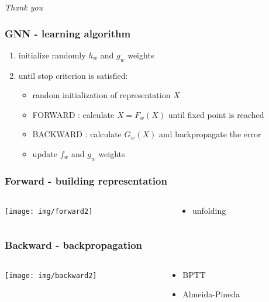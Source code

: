 \documentclass{beamer}
\begin{document}
\begin{frame}
\begin{center}
\Huge{\emph{Thank you}}
\end{center}
\end{frame}

\begin{frame}
\frametitle{GNN - learning algorithm}
\begin{enumerate}
	\item initialize randomly $h_w$ and $g_w$ weights
	\item until stop criterion is satisfied:
	\begin{itemize}
		\item random initialization of representation $X$
		\item FORWARD : calculate $X = F_w(X)$ until fixed point is reached
		\item BACKWARD : calculate $G_w(X)$ and backpropagate the error
		\item update $f_w$ and $g_w$ weights
	\end{itemize}
\end{enumerate}
\end{frame}

\begin{frame}
\frametitle{Forward - building representation}
\begin{columns}
	\begin{column}{0.66\textwidth}
		\texttt{[image: img/forward2]}
	\end{column}
	\begin{column}{0.34\textwidth}
		\begin{itemize}
			\item unfolding
		\end{itemize}
	\end{column}
\end{columns}
\end{frame}

\begin{frame}
\frametitle{Backward - backpropagation}
\begin{columns}
	\begin{column}{0.66\textwidth}
		\texttt{[image: img/backward2]}
	\end{column}
	\begin{column}{0.34\textwidth}
		\begin{itemize}
			\item BPTT
			\item Almeida-Pineda
		\end{itemize}
	\end{column}
\end{columns}
\end{frame}
\end{document}

